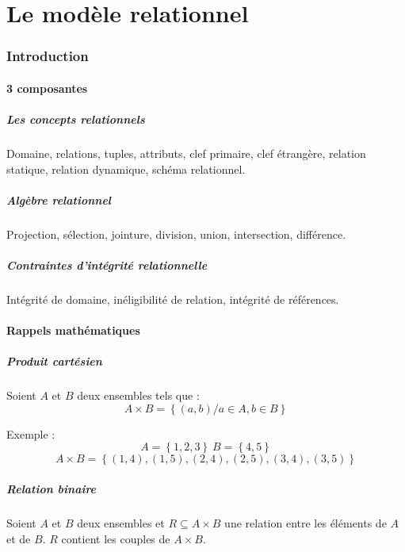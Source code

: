 \documentclass[10pt]{article}
\begin{document}
\newpage
\part{Le modèle relationnel}
    \section{Introduction}
        \subsection{3 composantes}
            \subsubsection*{Les concepts relationnels}
                Domaine, relations, tuples, attributs, clef primaire, clef étrangère, relation statique, relation dynamique, schéma relationnel.

            \subsubsection*{Algèbre relationnel}
                Projection, sélection, jointure, division, union, intersection, différence.

            \subsubsection*{Contraintes d'intégrité relationnelle}
                Intégrité de domaine, inéligibilité de relation, intégrité de références.

        \subsection{Rappels mathématiques}
            \subsubsection*{Produit cartésien}
                Soient $A$ et $B$ deux ensembles tels que :
                $$A\times B = \left\{(a,b)/a\in A, b\in B\right\}$$

                Exemple :
                $$A=\left\{1,2,3\right\} \: B=\left\{4,5\right\}$$
                $$A\times B = \left\{(1,4),(1,5),(2,4),(2,5),(3,4),(3,5)\right\}$$

            \subsubsection*{Relation binaire}
                Soient $A$ et $B$ deux ensembles et $R\subseteq A\times B$ une relation entre les éléments de $A$ et de $B$. $R$ contient les couples de $A\times B$.
\end{document}
